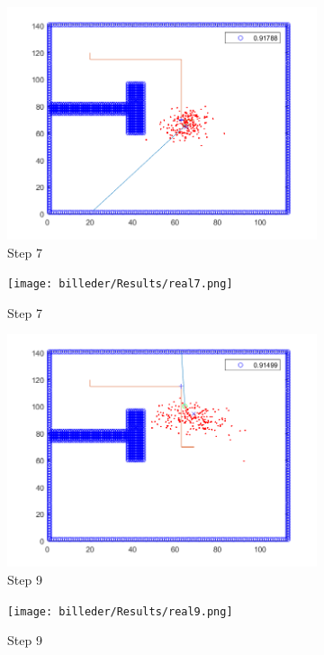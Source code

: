 \begin{figure}[H]
\centering
\begin{subfigure}{.5\textwidth}
  \centering
  \includegraphics[width=.8\linewidth]{billeder/Results/7.png}
  \caption{Step 7}
  \label{ResultDriveFig2:sub1}
\end{subfigure}%
\begin{subfigure}{.5\textwidth}
  \centering
  \texttt{[image: billeder/Results/real7.png]}
  \caption{Step 7}
  \label{ResultDriveFig2:sub2}
\end{subfigure}
\begin{subfigure}{.5\textwidth}
  \centering
  \includegraphics[width=.8\linewidth]{billeder/Results/9.png}
  \caption{Step 9}
  \label{ResultDriveFig2:sub3}
\end{subfigure}%
\begin{subfigure}{.5\textwidth}
  \centering
  \texttt{[image: billeder/Results/real9.png]}
  \caption{Step 9}
  \label{ResultDriveFig2:sub4}
\end{subfigure}
\begin{subfigure}{.5\textwidth}

\end{subfigure}
\end{figure}
